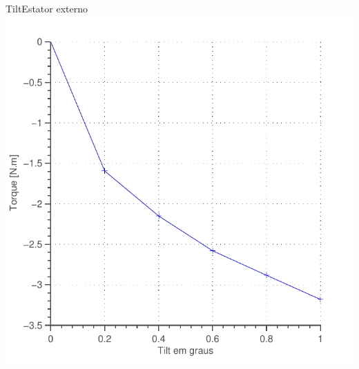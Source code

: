 \documentclass{beamer}
\begin{document}
\begin{frame}{Tilt}{Estator externo}
\centering
\includegraphics[width=0.7\linewidth]{Simulacoes/Passivo2/fem/passivo_otimizado_fem_tilt}
\end{frame}
\end{document}
